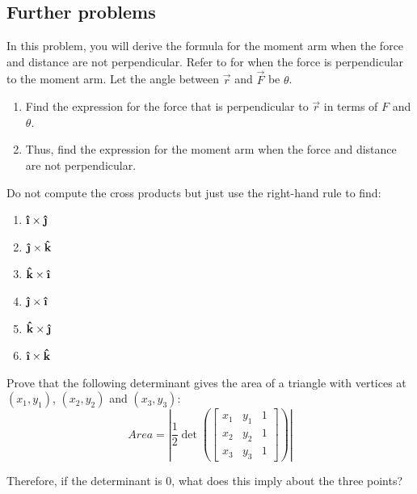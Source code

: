\subsection*{Further problems}
\begin{problem}[1]
  In this problem, you will derive the formula for the moment arm when the force and distance are not perpendicular. Refer to  for when the force is perpendicular to the moment arm. Let the angle between \(\vec{r}\) and \(\vec{F}\) be \(\theta\).
  \begin{enumerate}[label=\alph*)]
    \item{Find the expression for the force that is perpendicular to \(\vec{r}\) in terms of \(F\) and \(\theta\).}
    \item{Thus, find the expression for the moment arm when the force and distance are not perpendicular.}
  \end{enumerate}
  \label{torqueprob}
\end{problem}
\begin{problem}
  Do not compute the cross products but just use the right-hand rule to find:
  \begin{enumerate}[label=\alph*)]
    \item{\(\ihat\times\jhat\)}
    \item{\(\jhat\times\khat\)}
    \item{\(\khat\times\ihat\)}
    \item{\(\jhat\times\ihat\)}
    \item{\(\khat\times\jhat\)}
    \item{\(\ihat\times\khat\)}
    \end{enumerate}
\end{problem}
\begin{problem}[2]
  Prove that the following determinant gives the area of a triangle with vertices at \((x_1, y_1)\), \((x_2, y_2)\) and \((x_3, y_3)\):
  \begin{equation}
    \textit{Area} =  \left|\frac{1}{2}\det\left(\begin{bmatrix}
      x_1 & y_1 & 1 \\
      x_2 & y_2 & 1 \\
      x_3 & y_3 & 1
    \end{bmatrix}\right)\right|
  \end{equation}


  Therefore, if the determinant is 0, what does this imply about the three points?
\end{problem}
